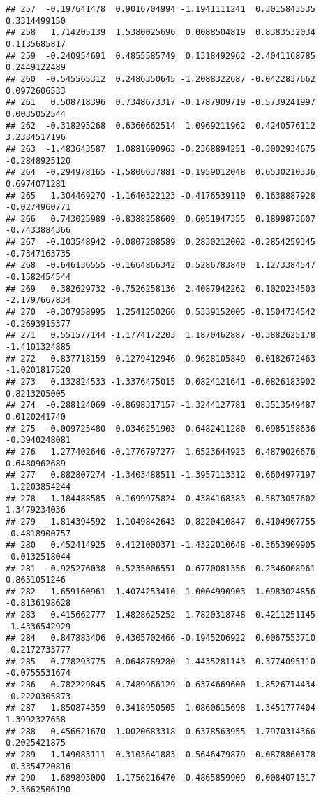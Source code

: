 \documentclass[
]{article}
\begin{document}
\begin{verbatim}
## 257  -0.197641478  0.9016704994 -1.1941111241  0.3015843535  0.3314499150
## 258   1.714205139  1.5380025696  0.0088504819  0.8383532034  0.1135685817
## 259  -0.240954691  0.4855585749  0.1318492962 -2.4041168785  0.2449122489
## 260  -0.545565312  0.2486350645 -1.2088322687 -0.0422837662  0.0972606533
## 261   0.508718396  0.7348673317 -0.1787909719 -0.5739241997  0.0035052544
## 262  -0.318295268  0.6360662514  1.0969211962  0.4240576112  3.2334517196
## 263  -1.483643587  1.0881690963 -0.2368894251 -0.3002934675 -0.2848925120
## 264  -0.294978165 -1.5806637881 -0.1959012048  0.6530210336  0.6974071281
## 265   1.304469270 -1.1640322123 -0.4176539110  0.1638887928 -0.0274960771
## 266   0.743025989 -0.8388258609  0.6051947355  0.1899873607 -0.7433884366
## 267  -0.103548942 -0.0807208589  0.2830212002 -0.2854259345 -0.7347163735
## 268  -0.646136555 -0.1664866342  0.5286783840  1.1273384547 -0.1582454544
## 269   0.382629732 -0.7526258136  2.4087942262  0.1020234503 -2.1797667834
## 270  -0.307958995  1.2541250266  0.5339152005 -0.1504734542 -0.2693915377
## 271   0.551577144 -1.1774172203  1.1870462887 -0.3882625178 -1.4101324885
## 272   0.837718159 -0.1279412946 -0.9628105849 -0.0182672463 -1.0201817520
## 273   0.132824533 -1.3376475015  0.0824121641 -0.0826183902  0.8213205005
## 274  -0.288124069 -0.8698317157 -1.3244127781  0.3513549487  0.0120241740
## 275  -0.009725480  0.0346251903  0.6482411280 -0.0985158636 -0.3940248081
## 276   1.277402646 -0.1776797277  1.6523644923  0.4879026676  0.6480962689
## 277   0.882807274 -1.3403488511 -1.3957113312  0.6604977197 -1.2203854244
## 278  -1.184488585 -0.1699975824  0.4384168383 -0.5873057602  1.3479234036
## 279   1.814394592 -1.1049842643  0.8220410847  0.4104907755 -0.4818900757
## 280   0.452414925  0.4121000371 -1.4322010648 -0.3653909905 -0.0132518044
## 281  -0.925276038  0.5235006551  0.6770081356 -0.2346008961  0.8651051246
## 282  -1.659160961  1.4074253410  1.0004990903  1.0983024856 -0.8136198628
## 283  -0.415662777 -1.4828625252  1.7820318748  0.4211251145 -1.4336542929
## 284   0.847883406  0.4305702466 -0.1945206922  0.0067553710 -0.2172733777
## 285   0.778293775 -0.0648789280  1.4435281143  0.3774095110 -0.0755531674
## 286  -0.782229845  0.7489966129 -0.6374669600  1.8526714434 -0.2220305873
## 287   1.850874359  0.3418950505  1.0860615698 -1.3451777404  1.3992327658
## 288  -0.456621670  1.0020683318  0.6378563955 -1.7970314366  0.2025421875
## 289  -1.149083111 -0.3103641883  0.5646479879 -0.0878860178 -0.3354720816
## 290   1.689893000  1.1756216470 -0.4865859909  0.0084071317 -2.3662506190

\end{verbatim}
\end{document}
